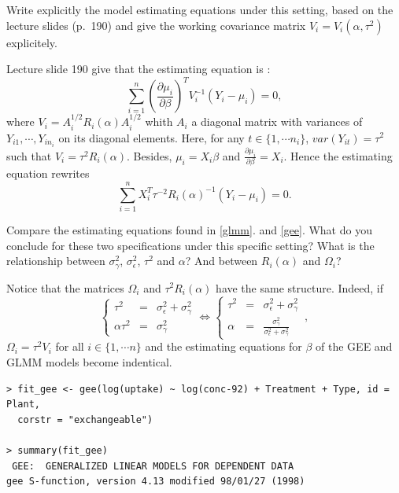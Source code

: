 \documentclass[11pt,a4paper%
addpoints, 
answers%
]{exam}
\begin{document}
\begin{questions}
\question[3] \label{gee}Write explicitly the model estimating equations under this setting, based on the lecture slides (p.~190) and give the working covariance matrix $V_i = V_i(\alpha,\tau^2)$ explicitely.
\begin{solution}
	Lecture slide 190 give that the estimating equation is : 
$$\sum_{i = 1}^{n} \left(\frac{\partial \mu_i}{\partial \beta}\right)^TV_i^{-1}(Y_i -  \mu_i) = 0,$$
where $V_i = A_i^{1/2} R_i(\alpha)A_i^{1/2}$ whith $A_i$ a diagonal matrix with variances of $Y_{i1},  \cdots, Y_{in_i}$ on its diagonal elements. 
Here, for any $t\in\{1,\cdots n_i\}$, $var(Y_{it}) = \tau^2$ such that
$V_i = \tau^2 R_i(\alpha)$. Besides, $\mu_i = X_i \beta$ and $\frac{\partial \mu_i}{\partial \beta} = X_i$. Hence the estimating equation rewrites
$$\sum_{i = 1}^{n} X_i^T \tau^{-2} R_i(\alpha)^{-1}(Y_i -  \mu_i) = 0.$$ 
\end{solution}
\question[2] Compare the estimating equations found in \ref{glmm}. and \ref{gee}. What do you conclude for these two specifications under this specific setting?
What is the relationship between $\sigma^2_\gamma$, $\sigma^2_\epsilon$, $\tau^2$ and $\alpha$? And between $R_i(\alpha)$ and $\Omega_i$?
\begin{solution}
Notice that the matrices $\Omega_i$ and $\tau^2 R_i(\alpha)$ have the same structure. 
Indeed, if 
$$\left\{\begin{array}{ccc}
	\tau^2 & = &\sigma_\epsilon^2 + \sigma_\gamma^2\\
	\alpha \tau^2 & = &\sigma_\gamma^2
\end{array}\right. \Longleftrightarrow \left\{\begin{array}{ccc}
\tau^2 & = &\sigma_\epsilon^2 + \sigma_\gamma^2\\
\alpha & = &\frac{\sigma_\gamma^2}{\sigma_\epsilon^2 + \sigma_\gamma^2}
\end{array}\right. \, ,$$
$\Omega_i = \tau^2 V_i$ for all $i \in \{1,\cdots n\}$ and the estimating equations for $\beta$ of the GEE and GLMM models become indentical. 

\end{solution}

\begin{center}
	\begin{verbatim}
> fit_gee <- gee(log(uptake) ~ log(conc-92) + Treatment + Type, id = Plant, 
  corstr = "exchangeable")	

> summary(fit_gee)
 GEE:  GENERALIZED LINEAR MODELS FOR DEPENDENT DATA
gee S-function, version 4.13 modified 98/01/27 (1998) 


\end{verbatim}
\end{center}
\end{questions}
\end{document}
